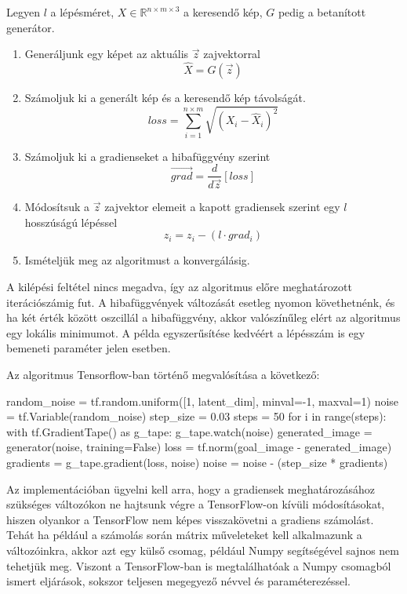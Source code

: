Legyen $l$ a lépésméret, $X \in \mathbb{R}^{n\times m \times 3}$ a keresendő kép, $G$ pedig a betanított generátor.
\begin{enumerate}
	\item Generáljunk egy képet az aktuális $\vec{z}$ zajvektorral
$$\hat X = G(\vec{z})$$
	\item Számoljuk ki a generált kép és a keresendő kép távolságát.
$$ loss = \sum_{i=1}^{n\times m}\sqrt{(X_i-\hat X_i)^2} $$
	\item Számoljuk ki a gradienseket a hibafüggvény szerint
$$ \vec{grad} = \frac{d}{d\vec{z}} \left[loss\right]$$
	\item Módosítsuk a $\vec{z}$ zajvektor elemeit a kapott gradiensek szerint egy $l$ hosszúságú lépéssel
$$ z_i = z_i - (l \cdot grad_i)$$
	\item Ismételjük meg az algoritmust a konvergálásig.
\end{enumerate}

A kilépési feltétel nincs megadva, így az algoritmus előre meghatározott iterációszámig fut. A hibafüggvények változását esetleg nyomon követhetnénk, és ha két érték között oszcillál a hibafüggvény, akkor valószínűleg elért az algoritmus egy lokális minimumot. A példa egyszerűsítése kedvéért a lépésszám is egy bemeneti paraméter jelen esetben.

Az algoritmus Tensorflow-ban történő megvalósítása a következő:

\begin{python}
random_noise = tf.random.uniform([1, latent_dim], minval=-1, maxval=1)
noise = tf.Variable(random_noise)
step_size = 0.03
steps = 50
for i in range(steps):
    with tf.GradientTape() as g_tape:
        g_tape.watch(noise)
        generated_image = generator(noise, training=False)
        loss = tf.norm(goal_image - generated_image)
    gradients = g_tape.gradient(loss, noise)
    noise = noise - (step_size * gradients)
\end{python}

Az implementációban ügyelni kell arra, hogy a gradiensek meghatározásához szükséges változókon ne hajtsunk végre a TensorFlow-on kívüli módosításokat, hiszen olyankor a TensorFlow nem képes visszakövetni a gradiens számolást. Tehát ha például a számolás során mátrix műveleteket kell alkalmazunk a változóinkra, akkor azt egy külső csomag, például Numpy segítségével sajnos nem tehetjük meg. Viszont a TensorFlow-ban is megtalálhatóak a Numpy csomagból ismert eljárások, sokszor teljesen megegyező névvel és paraméterezéssel.

